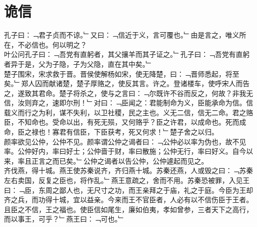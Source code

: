 \chapter{诡信}%
孔子曰：﹁君子贞而不谅。﹂又曰：﹁信近于义，言可覆也。﹂由是言之，唯义所在，不必信也。何以明之？\\
叶公问孔子曰：﹁吾党有直躬者，其父攘羊而其子证之。﹂孔子曰：﹁吾党有直躬者异于是，父为子隐，子为父隐，直在其中矣。﹂\\
楚子围宋，宋求救于晋。晋侯使解杨如宋，使无降楚，曰：﹁晋师悉起，将至矣。﹂郑人囚而献诸楚，楚子厚赂之，使反其言。许之。登诸楼车，使呼宋人而告之，遂致其君命。楚子将杀之，使与之言曰：﹁尔既许不谷而反之，何故？非我无信，汝则弃之，速即尔刑！﹂对曰：﹁臣闻之：君能制命为义，臣能承命为信。信载义而行之为利，谋不失利，以卫社稷，民之主也。义无二信，信无二命。君之赂臣，不知命也。受命以出，有死无殒，又何赂乎？臣之许君，以成命也。死而成命，臣之禄也！寡君有信臣，下臣获考，死又何求！﹂楚子舍之以归。
\\
颜率欲见公仲，公仲不见。颜率谓公仲之谒者曰：﹁公仲必以率为伪也，故不见率。公仲好内，率曰好士；公仲啬于财，率曰散施；公仲无行，率曰好义。自今以来，率且正言之而已矣。﹂公仲之谒者以告公仲，公仲遽起而见之。\\
齐伐燕，得十城。燕王使苏秦说齐，齐归燕十城。苏秦还燕，人或毁之曰：﹁苏秦左右卖国，反复之臣也，将作乱。﹂燕王意疏之，舍而不用。苏秦恐被罪，入见王曰：﹁臣，东周之鄙人也，无尺寸之功，而王亲拜之于庙，礼之于庭。今臣为王却齐之兵，而功得十城，宜以益亲。今来而王不官臣者，人必有以不信伤臣于王者。且臣之不信，王之福也。使臣信如尾生，廉如伯夷，孝如曾参，三者天下之高行，而以事王，可乎？﹂燕王曰：﹁可也。﹂\\
